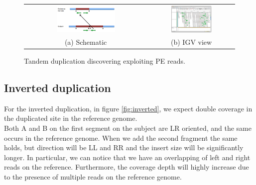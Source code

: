 \begin{figure}[H]
\begin{tabular}{cc}
  \includegraphics[width=0.5\textwidth]{tandem.png} &   \includegraphics[width=0.5\textwidth]{tandem_igv.png} \\
(a) Schematic & (b) IGV view \\[6pt]
\end{tabular}
\caption{Tandem duplication discovering exploiting PE reads.}
\label{fig:tandem}
\end{figure}

\subsection{Inverted duplication}
For the inverted duplication, in figure \ref{fig:inverted}, we expect double coverage in the duplicated site in the reference genome. \\
Both A and B on the first segment on the subject are LR oriented, and the same occurs in the reference genome.
When we add the second fragment the same holds, but direction will be LL and RR and the insert size will be significantly longer. In particular, we can notice that we have an overlapping of left and right reads on the reference. Furthermore, the coverage depth will highly increase due to the presence of multiple reads on the reference genome.

